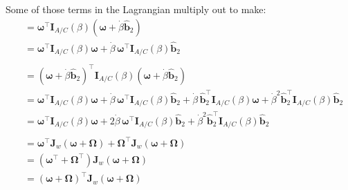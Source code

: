 \documentclass[titlepage]{article}
\begin{document}
Some of those terms in the Lagrangian multiply out to make:
\begin{equation}
	\begin{split}
		&=\boldsymbol{\omega}^\top\boldsymbol{I}_{A/C}(\beta)\left(\boldsymbol{\omega}+\dot{\beta}\hat{\boldsymbol{b}}_2\right) \\
		&=\boldsymbol{\omega}^\top\boldsymbol{I}_{A/C}(\beta)\boldsymbol{\omega}+\dot{\beta}\,\boldsymbol{\omega}^\top\boldsymbol{I}_{A/C}(\beta)\hat{\boldsymbol{b}}_2 \\
		\\
		&=\left(\boldsymbol{\omega}+\dot{\beta}\hat{\boldsymbol{b}}_2\right)^\top\boldsymbol{I}_{A/C}(\beta)\left(\boldsymbol{\omega}+\dot{\beta}\hat{\boldsymbol{b}}_2\right) \\
		&=\boldsymbol{\omega}^\top\boldsymbol{I}_{A/C}(\beta)\boldsymbol{\omega}+\dot{\beta}\,\boldsymbol{\omega}^\top\boldsymbol{I}_{A/C}(\beta)\hat{\boldsymbol{b}}_2+\dot{\beta}\,\hat{\boldsymbol{b}}_2^\top\boldsymbol{I}_{A/C}(\beta)\boldsymbol{\omega}+\dot{\beta}^2\hat{\boldsymbol{b}}_2^\top\boldsymbol{I}_{A/C}(\beta)\hat{\boldsymbol{b}}_2 \\
		&=\boldsymbol{\omega}^\top\boldsymbol{I}_{A/C}(\beta)\boldsymbol{\omega}+2\dot{\beta}\,\boldsymbol{\omega}^\top\boldsymbol{I}_{A/C}(\beta)\hat{\boldsymbol{b}}_2+\dot{\beta}^2\hat{\boldsymbol{b}}_2^\top\boldsymbol{I}_{A/C}(\beta)\hat{\boldsymbol{b}}_2 \\
		\\
		&=\boldsymbol{\omega}^\top\boldsymbol{J}_w\left(\boldsymbol{\omega}+\boldsymbol{\Omega}\right)+\boldsymbol{\Omega}^\top\boldsymbol{J}_w\left(\boldsymbol{\omega}+\boldsymbol{\Omega}\right) \\
		&=\left(\boldsymbol{\omega}^\top+\boldsymbol{\Omega}^\top\right)\boldsymbol{J}_w\left(\boldsymbol{\omega}+\boldsymbol{\Omega}\right) \\
		&=\left(\boldsymbol{\omega}+\boldsymbol{\Omega}\right)^\top\boldsymbol{J}_w\left(\boldsymbol{\omega}+\boldsymbol{\Omega}\right)
	\end{split}
	\label{eq:jacobiexpand}
\end{equation}
\end{document}
